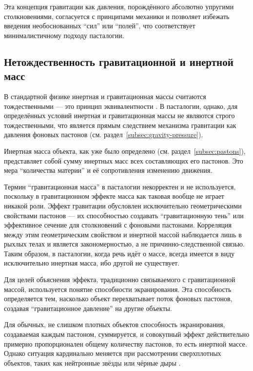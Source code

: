 \documentclass[pdflatex,sn-mathphys-num]{sn-jnl}
\begin{document}
Эта концепция гравитации как давления, порождённого абсолютно упругими столкновениями, согласуется с принципами механики и позволяет избежать введения необоснованных ``сил'' или ``полей'', что соответствует минималистичному подходу пасталогии.

\subsection{Нетождественность гравитационной и инертной масс}\label{subsec:mass-nonequivalence}

В стандартной физике инертная и гравитационная массы считаются тождественными --- это принцип эквивалентности \cite{einstein1920-relativity}. В пасталогии, однако, для определённых условий инертная и гравитационная массы не являются строго тождественными, что является прямым следствием механизма гравитации как давления фоновых пастонов (см. раздел~\ref{subsec:gravity-pressure}).

Инертная масса объекта, как уже было определено (см. раздел~\ref{subsec:pastons}), представляет собой сумму инертных масс всех составляющих его пастонов. Это мера ``количества материи'' и её сопротивления изменению движения.

Термин ``гравитационная масса'' в пасталогии некорректен и не используется, поскольку в гравитационном эффекте масса как таковая вообще не играет никакой роли. Эффект гравитации обусловлен исключительно геометрическими свойствами пастонов --- их способностью создавать ``гравитационную тень'' или эффективное сечение для столкновений с фоновыми пастонами. Корреляция между этим геометрическим свойством и инертной массой наблюдается лишь в рыхлых телах и является закономерностью, а не причинно-следственной связью. Таким образом, в пасталогии, когда речь идёт о массе, всегда имеется в виду исключительно инертная масса, ибо другой не существует.

Для целей объяснения эффекта, традиционно связываемого с гравитационной массой, используется понятие способности экранирования. Эта способность определяется тем, насколько объект перехватывает поток фоновых пастонов, создавая ``гравитационное давление'' на другие объекты.

Для обычных, не слишком плотных объектов способность экранирования, создаваемая каждым пастоном, суммируется, и совокупный эффект действительно примерно пропорционален общему количеству пастонов, то есть инертной массе. Однако ситуация кардинально меняется при рассмотрении сверхплотных объектов, таких как нейтронные звёзды или чёрные дыры \cite{shapiro-teukolsky1983}.
\end{document}

